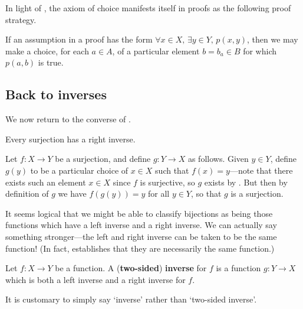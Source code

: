 In light of , the axiom of choice manifests itself in proofs as the following proof strategy.

\begin{strategyac}
\label{strUsingAC}
If an assumption in a proof has the form $\forall x \in X,\, \exists y \in Y,\, p(x,y)$, then we may make a choice, for each $a \in A$, of a particular element $b = b_a \in B$ for which $p(a,b)$ is true.
\end{strategyac}

\subsection*{Back to inverses}

We now return to the converse of .

\begin{propositionac}
Every surjection has a right inverse.
\end{propositionac}

\begin{cproof}
Let $f : X \to Y$ be a surjection, and define $g : Y \to X$ as follows. Given $y \in Y$, define $g(y)$ to be a particular choice of $x \in X$ such that $f(x) = y$---note that there exists such an element $x \in X$ since $f$ is surjective, so $g$ exists by . But then by definition of $g$ we have $f(g(y)) = y$ for all $y \in Y$, so that $g$ is a surjection.
\end{cproof}

It seems logical that we might be able to classify bijections as being those functions which have a left inverse and a right inverse. We can actually say something stronger---the left and right inverse can be taken to be the same function! (In fact,  establishes that they are necessarily the same function.)

\begin{definition}
\label{defInverse}
Let $f : X \to Y$ be a function. A (\textbf{two-sided}) \textbf{inverse} for $f$ is a function $g : Y \to X$ which is both a left inverse and a right inverse for $f$.
\end{definition}

It is customary to simply say `inverse' rather than `two-sided inverse'.

